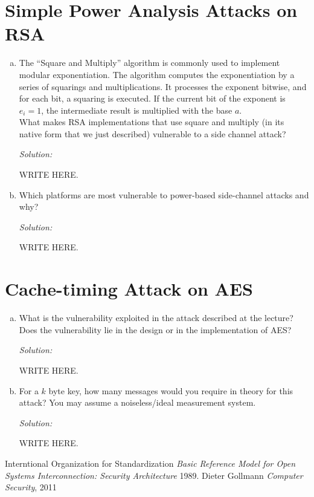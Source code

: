 \documentclass[a4paper,11pt]{article}
\newcommand{\includeonlyinsolution}[1]{\ifsolution#1\fi}
\newenvironment{solution}%
{\par{\noindent\small\textit{Solution:}}\vspace{-12pt}\begin{framed}}%
{\end{framed}\par}
\begin{document}
\section{Simple Power Analysis Attacks on RSA}
\begin{enumerate}[(a)]

\item The ``Square and Multiply'' algorithm is commonly used to implement
  modular exponentiation. The algorithm computes the exponentiation by a
  series of squarings and multiplications. It processes the exponent bitwise,
  and for each bit, a squaring is executed. If the current bit of the exponent
  is $e_i=1$, the intermediate result is multiplied with the base $a$. \\
  What makes RSA implementations that use square and multiply (in its native
  form that we just described) vulnerable to a side channel
  attack?
\includeonlyinsolution{\begin{solution}
WRITE HERE.
\end{solution}}


\item Which platforms are most vulnerable to power-based side-channel attacks and why?
\includeonlyinsolution{\begin{solution}
WRITE HERE.
\end{solution}}
\end{enumerate}


\section{Cache-timing Attack on AES}
\begin{enumerate}[(a)]
\item What is the vulnerability exploited in the attack described at the
  lecture? Does the vulnerability lie in the design or in the implementation of AES?
\includeonlyinsolution{\begin{solution}
WRITE HERE.
\end{solution}}

\item For a $k$ byte key, how many messages would you require in theory for
  this attack? You may assume a noiseless/ideal measurement system.
\includeonlyinsolution{\begin{solution}
WRITE HERE.
\end{solution}}
\end{enumerate}

\begin{thebibliography}{1}

   Interntional Organization for Standardization
    {\em Basic Reference Model for Open Systems Interconnection:
    Security Architecture}  1989.
   Dieter Gollmann {\em Computer Security}, 2011
\end{thebibliography}
\end{document}
